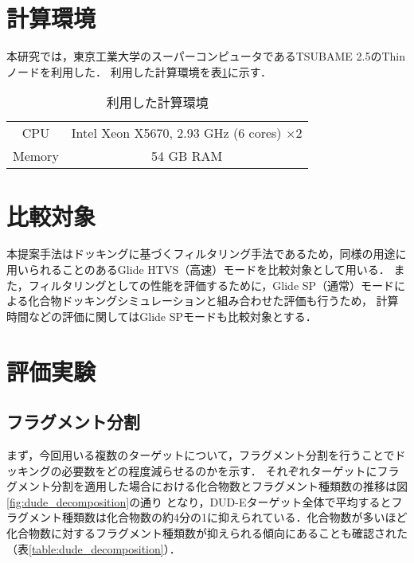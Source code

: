 \section{計算環境}
本研究では，東京工業大学のスーパーコンピュータであるTSUBAME 2.5のThinノードを利用した．
利用した計算環境を表\ref{table:computer_node}に示す．

\begin{table}[htb] \centering
	\caption{利用した計算環境}
	\label{table:computer_node}
	\begin{tabular}{cc}
	\hline
	CPU		&Intel Xeon X5670, 2.93 GHz (6 cores) $\times2$ \\
	Memory	& 54 GB RAM \\ \hline 
	\end{tabular}
\end{table}

\section{比較対象}
本提案手法はドッキングに基づくフィルタリング手法であるため，同様の用途に用いられることのあるGlide HTVS（高速）モードを比較対象として用いる．
また，フィルタリングとしての性能を評価するために，Glide SP（通常）モードによる化合物ドッキングシミュレーションと組み合わせた評価も行うため，
計算時間などの評価に関してはGlide SPモードも比較対象とする．

\section{評価実験}

\subsection{フラグメント分割}\label{subsec:result_decomposition}
まず，今回用いる複数のターゲットについて，フラグメント分割を行うことでドッキングの必要数をどの程度減らせるのかを示す．
それぞれターゲットにフラグメント分割を適用した場合における化合物数とフラグメント種類数の推移は図\ref{fig:dude_decomposition}の通り
となり，DUD-Eターゲット全体で平均するとフラグメント種類数は化合物数の約4分の1に抑えられている．化合物数が多いほど
化合物数に対するフラグメント種類数が抑えられる傾向にあることも確認された（表\ref{table:dude_decomposition}）．

